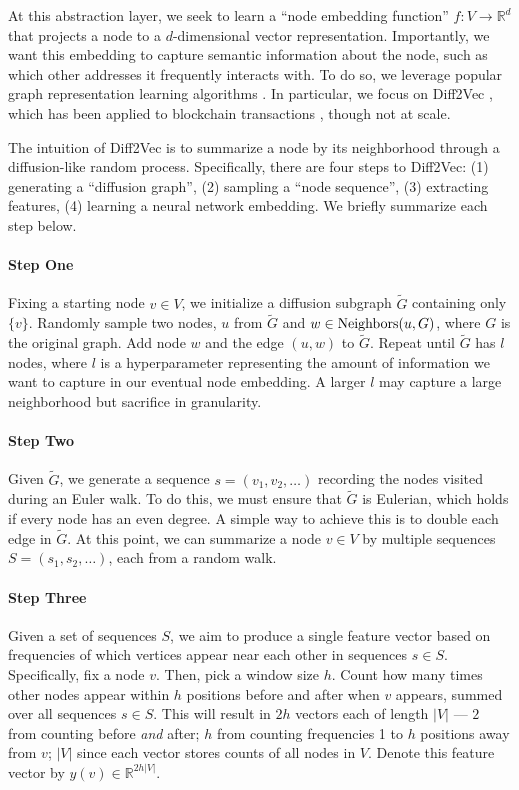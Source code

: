 At this abstraction layer, we seek to learn a ``node embedding function'' $f: V \rightarrow \mathbb{R}^d$ that projects a node to a $d$-dimensional vector representation. Importantly, we want this embedding to capture semantic information about the node, such as which other addresses it frequently interacts with. To do so, we leverage popular graph representation learning algorithms \citep{grover2016node2vec,rozemberczki2018fast}. In particular, we focus on Diff2Vec \citep{rozemberczki2018fast}, which has been applied to blockchain transactions \citep{beres2021blockchain}, though not at scale.

The intuition of Diff2Vec is to summarize a node by its neighborhood through a diffusion-like random process. Specifically, there are four steps to Diff2Vec: (1) generating a ``diffusion graph'', (2) sampling a ``node sequence'', (3) extracting features, (4) learning a neural network embedding. We briefly summarize each step below.

\paragraph{Step One} Fixing a starting node $v \in V$, we initialize a diffusion subgraph $\tilde{G}$ containing only $\{v\}$. Randomly sample two nodes, $u$ from $\tilde{G}$ and $w \in \textup{Neighbors}(u, G)$, where $G$ is the original graph. Add node $w$ and the edge $(u, w)$ to $\tilde{G}$. Repeat until $\tilde{G}$ has $l$ nodes, where $l$ is a hyperparameter representing the amount of information we want to capture in our eventual node embedding. A larger $l$ may capture a large neighborhood but sacrifice in granularity.

\paragraph{Step Two} Given $\tilde{G}$, we generate a sequence $s = (v_1, v_2, \ldots)$ recording the nodes visited during an Euler walk. To do this, we must ensure that $\tilde{G}$ is Eulerian, which holds if every node has an even degree. A simple way to achieve this is to double each edge in $\tilde{G}$. At this point, we can summarize a node $v \in V$ by multiple sequences $S = (s_1, s_2, \ldots)$, each from a random walk.

\paragraph{Step Three} Given a set of sequences $S$, we aim to produce a single feature vector based on frequencies of which vertices appear near each other in sequences $s \in S$. Specifically, fix a node $v$. Then, pick a window size $h$.
Count how many times other nodes appear within $h$ positions before and after when $v$ appears, summed over all sequences $s \in S$. This will result in $2h$ vectors each of length $|V|$ --- $2$ from counting before \textit{and} after; $h$ from counting frequencies 1 to $h$ positions away from $v$; $|V|$ since each vector stores counts of all nodes in $V$. Denote this feature vector by $y(v) \in \mathbb{R}^{2h|V|}$.

